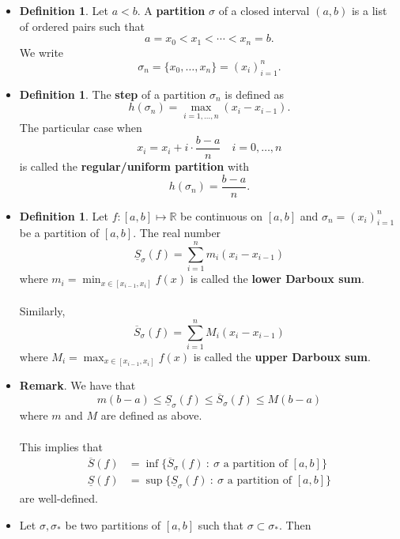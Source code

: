 \documentclass{article}
\newcommand{\R}{\mathbb{R}}
\newcommand{\?}{\stackrel{?}{=}}
\theoremstyle{definition} %
\newtheorem{definition}[theorem]{Definition} %
\begin{document}
\begin{itemize}
    \item[]
    \begin{definition}
        Let $a < b$. A \textbf{partition} $\sigma$ of a closed interval $(a, b)$ is a list of ordered pairs such that
        $$a = x_0 < x_1 < \cdots < x_n = b.$$
        We write
        $$\sigma_n = \{x_0, \ldots, x_n\} = (x_i)_{i = 1}^{n}.$$
    \end{definition}
    \item[]
    \begin{definition}
        The \textbf{step} of a partition $\sigma_n$ is defined as
        $$h(\sigma_n) = \max_{i = 1, \ldots, n}(x_i - x_{i - 1}).$$
        The particular case when
        $$x_i = x_i + i \cdot \frac{b - a}{n} \quad i = 0, \ldots, n$$
        is called the \textbf{regular/uniform partition} with
        $$h(\sigma_n) = \frac{b - a}{n}.$$
    \end{definition}
    \item[]
    \begin{definition}
        Let $f: [a, b] \mapsto \R$ be continuous on $[a, b]$ and $\sigma_n = (x_i)_{i = 1}^{n}$ be a partition of $[a, b]$. The real number
        $$\underline{S}_{\sigma}(f) = \sum_{i = 1}^{n} m_i(x_i - x_{i - 1})$$
        where $m_i = \min_{x \in [x_{i - 1}, x_i]} f(x)$ is called the \textbf{lower Darboux sum}. \\\\
        Similarly,
        $$\overline{S}_{\sigma}(f) = \sum_{i = 1}^{n} M_i(x_i - x_{i - 1})$$
        where $M_i = \max_{x \in [x_{i - 1}, x_i]} f(x)$ is called the \textbf{upper Darboux sum}.
    \end{definition}
    \item \textbf{Remark}. We have that
    $$m(b - a) \leq \underline{S}_{\sigma}(f) \leq \overline{S}_{\sigma}(f) \leq M(b - a)$$
    where $m$ and $M$ are defined as above. \\\\
    This implies that
    \begin{align*}
        \overline{S}(f) &= \inf\{\overline{S}_{\sigma}(f) \ : \ \sigma \text{ a partition of } [a, b]\} \\
        \underline{S}(f) &= \sup\{\underline{S}_{\sigma}(f) \ : \ \sigma \text{ a partition of } [a, b]\}
    \end{align*}
    are well-defined.
    \item[]
    \begin{lemma}
        Let $\sigma, \sigma_*$ be two partitions of $[a, b]$ such that $\sigma \subset \sigma_*$. Then 

\end{lemma}
\end{itemize}
\end{document}
